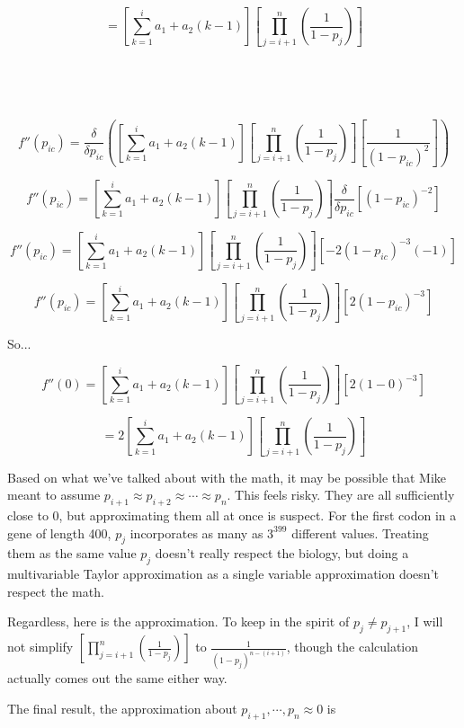\documentclass[11pt]{article} %
\begin{document}
$$=
\left[\sum_{k=1}^{i} a_1 + a_2(k-1)\right]
\left[\prod_{j=i+1}^{n}(\frac{1}{1-p_{j}})\right]
$$

~

\noindent\makebox[\linewidth]{\rule{\textwidth}{1pt}} 

~

$$f''(p_{ic})=
\frac{\delta}{\delta p_{ic}}\left(
\left[\sum_{k=1}^{i} a_1 + a_2(k-1)\right]
\left[\prod_{j=i+1}^{n}(\frac{1}{1-p_{j}})\right]
\left[\frac{1}
{(1-p_{ic})^2}\right]
\right)
$$


$$f''(p_{ic})=
\left[\sum_{k=1}^{i} a_1 + a_2(k-1)\right]
\left[\prod_{j=i+1}^{n}(\frac{1}{1-p_{j}})\right]
\frac{\delta}{\delta p_{ic}}
\left[
(1-p_{ic})^{-2}
\right]
$$

$$f''(p_{ic})=
\left[\sum_{k=1}^{i} a_1 + a_2(k-1)\right]
\left[\prod_{j=i+1}^{n}(\frac{1}{1-p_{j}})\right]
\left[
-2 (1-p_{ic})^{-3} (-1)
\right]
$$

$$f''(p_{ic})=
\left[\sum_{k=1}^{i} a_1 + a_2(k-1)\right]
\left[\prod_{j=i+1}^{n}(\frac{1}{1-p_{j}})\right]
\left[
2 (1-p_{ic})^{-3}
\right]
$$

So...

$$f''(0)=
\left[\sum_{k=1}^{i} a_1 + a_2(k-1)\right]
\left[\prod_{j=i+1}^{n}(\frac{1}{1-p_{j}})\right]
\left[
2 (1-0)^{-3}
\right]
$$

$$=
2
\left[\sum_{k=1}^{i} a_1 + a_2(k-1)\right]
\left[\prod_{j=i+1}^{n}(\frac{1}{1-p_{j}})\right]
$$



\newpage


Based on what we've talked about with the math, it may be possible that Mike meant to assume $p_{i+1} \approx p_{i+2} \approx \cdots \approx p_{n}$. This feels risky. They are all sufficiently close to 0, but approximating them all at once is suspect. For the first codon in a gene of length 400, $p_j$ incorporates as many as $3^{399}$ different values. Treating them as the same value $p_j$ doesn't really respect the biology, but doing a multivariable Taylor approximation as a single variable approximation doesn't respect the math.

Regardless, here is the approximation. To keep in the spirit of $p_{j} \neq p_{j+1}$, I will not simplify $\left[\prod_{j=i+1}^{n}(\frac{1}{1-p_{j}})\right]$ to $\frac{1}{(1-p_{j})^{n-(i+1)}}$, though the calculation actually comes out the same either way.

The final result, the approximation about $p_{i+1}, \cdots, p_n \approx 0$ is
\end{document}

